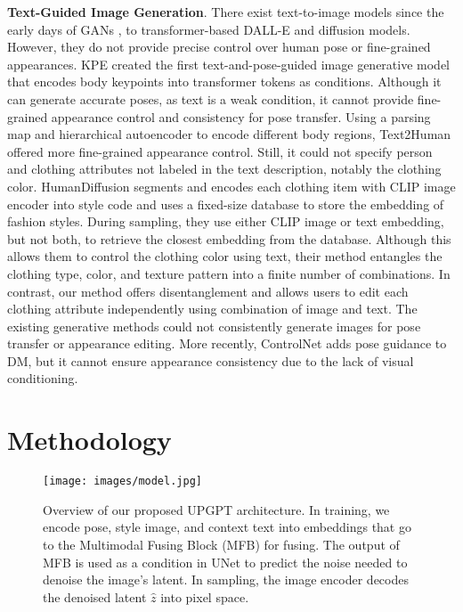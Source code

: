\documentclass[10pt,twocolumn,letterpaper]{article}
\begin{document}
\textbf{Text-Guided Image Generation}. 
There exist text-to-image models since the early days of GANs \cite{stackgan, attngan, dmgan}, to transformer\cite{transformer}-based DALL-E\cite{dalle} and diffusion models\cite{glide,dalle2,ldm, imagen}. However, they do not provide precise control over human pose or fine-grained appearances. KPE\cite{kpe} created the first text-and-pose-guided image generative model that encodes body keypoints into transformer tokens as conditions. Although it can generate accurate poses, as text is a weak condition, it cannot provide fine-grained appearance control and consistency for pose transfer. Using a parsing map and hierarchical autoencoder to encode different body regions, Text2Human\cite{text2human} offered more fine-grained appearance control. Still, it could not specify person and clothing attributes not labeled in the text description, notably the clothing color. HumanDiffusion\cite{human_diffusion} segments and encodes each clothing item with CLIP image encoder into style code and uses a fixed-size database to store the embedding of fashion styles. During sampling, they use either CLIP image or text embedding, but not both, to retrieve the closest embedding from the database. Although this allows them to control the clothing color using text, their method entangles the clothing type, color, and texture pattern into a finite number of combinations. In contrast, our method offers disentanglement and allows users to edit each clothing attribute independently using combination of image and text. The existing generative methods could not consistently generate images for pose transfer or appearance editing. More recently, ControlNet \cite{controlnet} adds pose guidance to DM, but it cannot ensure appearance consistency due to the lack of visual conditioning.
\vspace{-4mm}
\section{Methodology}
\begin{figure*}[!htb]
    \begin{center}
        \texttt{[image: images/model.jpg]}
    \end{center}
    \caption{Overview of our proposed UPGPT architecture. In training, we encode pose, style image, and context text into embeddings that go to the Multimodal Fusing Block (MFB) for fusing. The output of MFB is used as a condition in UNet to predict the noise needed to denoise the image's latent. In sampling, the image encoder decodes the denoised latent $\hat{z}$ into pixel space.}
    \label{fig:model_1}
\end{figure*}
\end{document}
